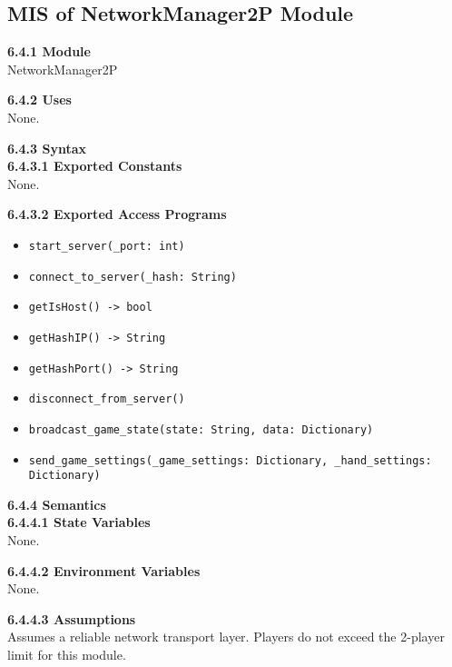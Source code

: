 \documentclass[12pt, titlepage]{article}
\begin{document}
\subsection{MIS of NetworkManager2P Module}
\textbf{6.4.1 Module}\\
NetworkManager2P

\textbf{6.4.2 Uses}\\
None.

\textbf{6.4.3 Syntax}\\
\textbf{6.4.3.1 Exported Constants}\\
None.  

\textbf{6.4.3.2 Exported Access Programs}
\begin{itemize}
    \item \texttt{start\_server(\_port: int)}
    \item \texttt{connect\_to\_server(\_hash: String)}
    \item \texttt{getIsHost() -> bool}
    \item \texttt{getHashIP() -> String}
    \item \texttt{getHashPort() -> String}
    \item \texttt{disconnect\_from\_server()}
    \item \texttt{broadcast\_game\_state(state: String, data: Dictionary)}
    \item \texttt{send\_game\_settings(\_game\_settings: Dictionary, \_hand\_settings: Dictionary)}
\end{itemize}

\textbf{6.4.4 Semantics}\\
\textbf{6.4.4.1 State Variables}\\
None.

\textbf{6.4.4.2 Environment Variables}\\
None.

\textbf{6.4.4.3 Assumptions}\\
Assumes a reliable network transport layer. Players do not exceed the 2-player limit for this module.
\end{document}
